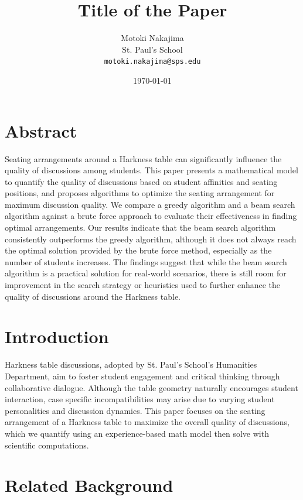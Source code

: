 \documentclass[11pt]{article}
\title{Title of the Paper}
\author{Motoki Nakajima \\ St. Paul's School \\ \texttt{motoki.nakajima@sps.edu}}
\date{\today}
\begin{document}
\maketitle

\section{Abstract}

Seating arrangements around a Harkness table can significantly influence the quality of discussions among students.
This paper presents a mathematical model to quantify the quality of discussions based on student affinities and seating positions, and proposes algorithms to optimize the seating arrangement for maximum discussion quality.
We compare a greedy algorithm and a beam search algorithm against a brute force approach to evaluate their effectiveness in finding optimal arrangements.
Our results indicate that the beam search algorithm consistently outperforms the greedy algorithm, although it does not always reach the optimal solution provided by the brute force method, especially as the number of students increases.
The findings suggest that while the beam search algorithm is a practical solution for real-world scenarios, there is still room for improvement in the search strategy or heuristics used to further enhance the quality of discussions around the Harkness table.

\section{Introduction}

Harkness table discussions, adopted by St. Paul's School's Humanities Department, aim to foster student engagement and critical thinking through collaborative dialogue.
Although the table geometry naturally encourages student interaction, case specific incompatibilities may arise due to varying student personalities and discussion dynamics.
This paper focuses on the seating arrangement of a Harkness table to maximize the overall quality of discussions, which we quantify using an experience-based math model then solve with scientific computations.
\section{Related Background}
\end{document}
